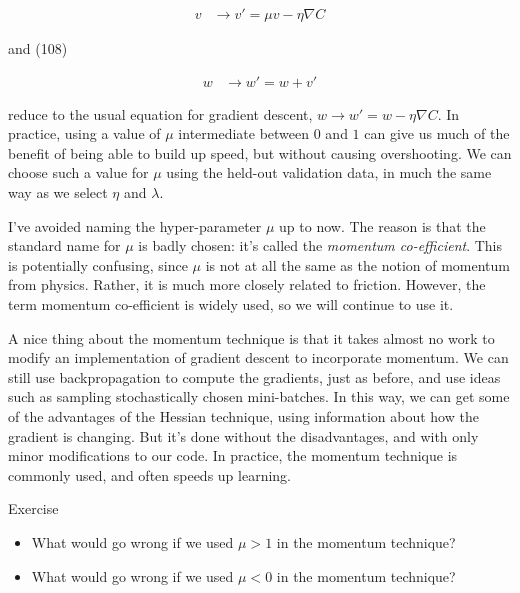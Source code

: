 \begin{align*}
v &\rightarrow v' = \mu v - \eta \nabla C \nonumber
\end{align*}

\noindent and (108)

\begin{align*}
w &\rightarrow w' = w+v' \nonumber
\end{align*}

\noindent reduce to the usual equation for gradient descent, $w \rightarrow w'=w-\eta \nabla C$. In practice, using a value of $\mu$ intermediate between $0$ and $1$ can give us much of the benefit of being able to build up speed, but without causing overshooting. We can choose such a value for $\mu$ using the held-out validation data, in much the same way as we select $\eta$ and $\lambda$.


I've avoided naming the hyper-parameter $\mu$ up to now. The reason is that the standard name for $\mu$ is badly chosen: it's called the \emph{momentum co-efficient}. This is potentially confusing, since $\mu$ is not at all the same as the notion of momentum from physics. Rather, it is much more closely related to friction. However, the term momentum co-efficient is widely used, so we will continue to use it.


A nice thing about the momentum technique is that it takes almost no work to modify an implementation of gradient descent to incorporate momentum. We can still use backpropagation to compute the gradients, just as before, and use ideas such as sampling stochastically chosen mini-batches. In this way, we can get some of the advantages of the Hessian technique, using information about how the gradient is changing. But it's done without the disadvantages, and with only minor modifications to our code. In practice, the momentum technique is commonly used, and often speeds up learning.



\begin{exerciseBox}{Exercise}


\begin{itemize}

\item What would go wrong if we used $\mu > 1$ in the momentum technique?

\item What would go wrong if we used $\mu < 0$ in the momentum technique?

\end{itemize}

\end{exerciseBox}



